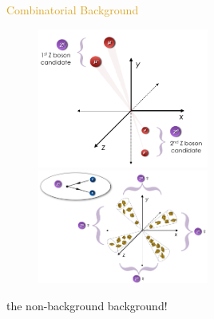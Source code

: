 \begin{frame}{\textcolor{Goldenrod}{Combinatorial Background}}
  \begin{overlayarea}{\textwidth}{\textheight}
    \begin{figure}[h]
      \centering
      \includegraphics[height=0.5\textheight, width=0.5\textwidth]{./Images/103_extra_combinatorial_bkgs_01}
      \includegraphics[height=0.5\textheight, width=0.5\textwidth]{./Images/103_extra_combinatorial_bkgs_02}
    \end{figure}
    
    \itt
  \item the non-background background!
    \tti
  \end{overlayarea}
\end{frame}


